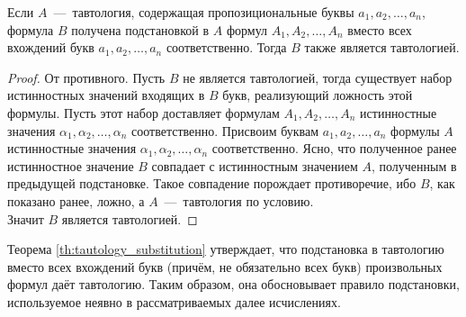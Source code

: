 \begin{theorem}\label{th:tautology_substitution}
    Если $A$~---~тавтология, содержащая пропозициональные буквы $a_1, a_2, \dots, a_n$, формула $B$ получена подстановкой в $A$ формул $A_1, A_2, \dots, A_n$ вместо всех вхождений букв $a_1, a_2, \dots, a_n$ соответственно. Тогда $B$ также является тавтологией.
\end{theorem}
\begin{proof}
    От противного. Пусть $B$ не является тавтологией, тогда существует набор истинностных значений входящих в $B$ букв, реализующий ложность этой формулы. Пусть этот набор доставляет формулам $A_1, A_2, \dots, A_n$ истинностные значения $\alpha_1, \alpha_2, \dots, \alpha_n$ соответственно. Присвоим буквам $a_1, a_2, \dots, a_n$ формулы $A$ истинностные значения $\alpha_1, \alpha_2, \dots, \alpha_n$ соответственно. Ясно, что полученное ранее истинностное значение $B$ совпадает с истинностным значением $A$, полученным в предыдущей подстановке. Такое совпадение порождает противоречие, ибо $B$, как показано ранее, ложно, а $A$~---~тавтология по условию. \\
    Значит $B$ является тавтологией.
\end{proof}

Теорема \ref{th:tautology_substitution} утверждает, что подстановка в тавтологию вместо всех вхождений букв (причём, не обязательно всех букв) произвольных формул даёт тавтологию. Таким образом, она обосновывает правило подстановки, используемое неявно в рассматриваемых далее исчислениях.